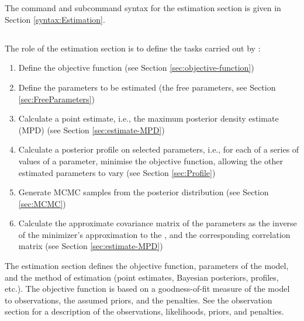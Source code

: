 \section{\label{sec:Estimation}}

The command and subcommand syntax for the estimation section is given in Section \ref{syntax:Estimation}.

\subsection{\label{sec:role-of-the-estimation-section}}

The role of the estimation section is to define the tasks carried out by \CNAME:

\begin{enumerate}
  \item Define the objective function (see Section \ref{sec:objective-function})
  \item Define the parameters to be estimated (the free parameters, see Section \ref{sec:FreeParameters})
  \item Calculate a point estimate, i.e., the maximum posterior density estimate (MPD) (see Section \ref{sec:estimate-MPD})
  \item Calculate a posterior profile on selected parameters, i.e., for each of a series of values of a parameter, minimise the objective function, allowing the other estimated parameters to vary (see Section \ref{sec:Profile})
  \item Generate MCMC samples from the posterior distribution (see Section \ref{sec:MCMC})
  \item Calculate the approximate covariance matrix of the parameters as the inverse of the minimizer\textquoteright{}s approximation to the , and the corresponding correlation matrix (see Section \ref{sec:estimate-MPD})
\end{enumerate}

The estimation section defines the objective function, parameters of the model, and the method of estimation (point estimates, Bayesian posteriors, profiles, etc.). The objective function is based on a goodness-of-fit measure of the model to observations, the assumed priors, and the penalties. See the observation section for a description of the observations, likelihoods, priors, and penalties.

